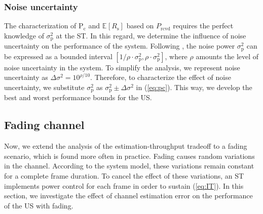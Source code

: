 \documentclass[conference, twocolumn]{IEEEtran}
\newcommand{\e}[2]{{\mathbb E}_{#1}\left[ #2 \right]}
\newcommand{\sub}[1]{_{\text{#1}}}
\newcommand{\pc}{\text{P}\sub{c}}
\newcommand{\prcvd}{P\sub{rcvd}}
\newcommand{\rs}{R\sub{s}}
\newcommand{\npp}{\sigma^2\sub{p}}
\newcommand{\npu}{\Delta\sigma^2}
\begin{document}
\subsubsection*{Noise uncertainty}
The characterization of $\pc$ and $\e{}{\rs}$ based on $\prcvd$ requires the perfect knowledge of $\npp$ at the ST. In this regard, we determine the influence of noise uncertainty on the performance of the system. Following \cite{Tan08}, the noise power $\npp$ can be expressed as a bounded interval $\left[1/\rho \cdot \npp, \rho \cdot \npp \right]$, where $\rho$ amounts the level of noise uncertainty in the system. To simplify the analysis, we represent noise uncertainty as $\npu = 10^{\rho/10}$. Therefore, to characterize the effect of noise uncertainty, we substitute $\npp$ as $\npp \pm \npu$ in (\ref{eq:pc}). This way, we develop the best and worst performance bounds for the US. 
\subsection{Fading channel}
Now, we extend the analysis of the estimation-throughput tradeoff to a fading scenario, which is found more often in practice. Fading causes random variations in the channel. According to the system model, these variations remain constant for a complete frame duration. To cancel the effect of these variations, an ST implements power control for each frame in order to sustain (\ref{eq:IT}). In this section, we investigate the effect of channel estimation error on the performance of the US with fading. 
\end{document}
